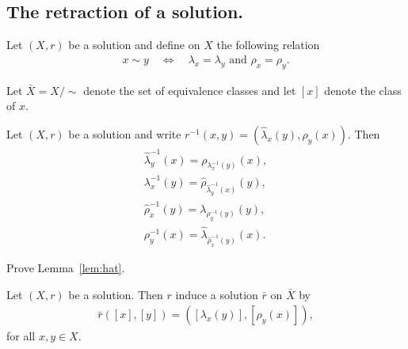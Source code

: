 
    
    

\subsection{The retraction of a solution.}

Let $(X,r)$ be a solution and define on $X$ the following relation
\begin{align*}
    x\sim y \quad \iff \quad \lambda_x=\lambda_y \text{ and } \rho_x=\rho_y.
\end{align*}

Let $\bar{X}=X/\sim$ denote the set of equivalence classes and let $[x]$ denote the class of $x$.

\begin{lemma}\label{lem:hat}
    Let $(X,r)$ be a solution and write $r^{-1}(x,y)= (\hat{\lambda}_x(y),\hat{\rho}_y(x))$.
    Then 
    \begin{align}
        \label{eq:hat1}\hat{\lambda}^{-1}_y(x)=\rho_{\lambda^{-1}_x(y)}(x),\\
        \label{eq:hat2}\lambda^{-1}_x(y)=\hat{\rho}_{\hat{\lambda}^{-1}_y(x)}(y),\\
        \label{eq:hat3}\hat{\rho}^{-1}_x(y)=\lambda_{\rho^{-1}_y(y)}(y),\\
        \label{eq:hat4}\rho^{-1}_y(x) = \hat{\lambda}_{\hat{\rho}^{-1}_x(y)}(x).
    \end{align}
\end{lemma}

\begin{exercise}
    \label{ex:hat}
    Prove Lemma~\ref{lem:hat}.
\end{exercise}

\begin{theorem}
    Let $(X,r)$ be a solution. Then $r$ induce a solution $\bar{r}$ on $\bar{X}$ by
    \begin{align*}
        \bar{r}([x],[y])= ([\lambda_x(y)], [\rho_y(x)]),
    \end{align*}
    for all $x,y\in X$.
\end{theorem}

